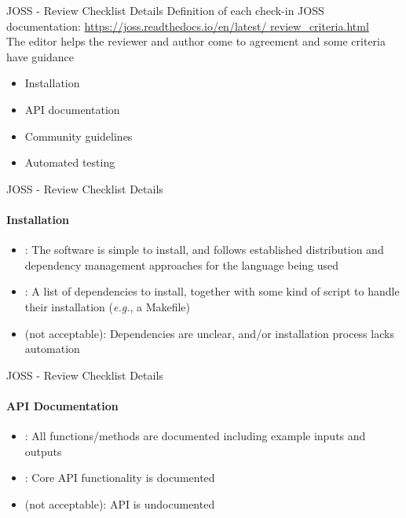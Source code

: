 \begin{frame}{JOSS - Review Checklist Details}
Definition of each check-in JOSS documentation:
\url{https://joss.readthedocs.io/en/latest/
review_criteria.html}\\
\vspace{0.5cm}
The editor helps the reviewer and author come to
agreement and some criteria have guidance
\vspace{0.5cm}
\begin{itemize}
    \item Installation
    \item API documentation
    \item Community guidelines
    \item Automated testing
\end{itemize}
    
\end{frame}

\begin{frame}{JOSS - Review Checklist Details}
\framesubtitle{Installation}

\begin{itemize}
    \item {}: The software is simple to install, and
follows established distribution and dependency
management approaches for the language
being used
\item {}: A list of dependencies to install, together
with some kind of script to handle their
installation (\emph{e.g.}, a Makefile)
\item {} (not acceptable): Dependencies are unclear,
and/or installation process lacks automation
\end{itemize}
    
\end{frame}

\begin{frame}{JOSS - Review Checklist Details}
\framesubtitle{API Documentation}

\begin{itemize}
        \item {}: All functions/methods are documented
including example inputs and outputs
\item {}: Core API functionality is documented
\item {} (not acceptable): API is undocumented
\end{itemize}
    
\end{frame}

